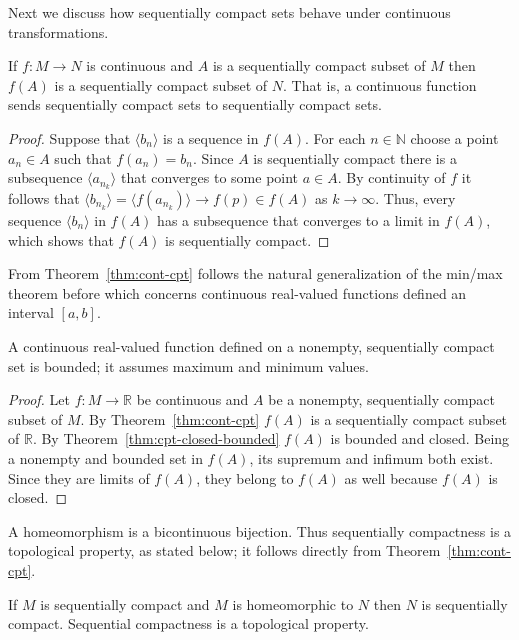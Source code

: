 Next we discuss how sequentially compact sets behave under continuous transformations.

\begin{thm}
  \label{thm:cont-cpt}
  If $f : M \to N$ is continuous and $A$ is a sequentially compact subset of $M$ then $f(A)$ is a sequentially compact subset of $N$.
  That is, a continuous function sends sequentially compact sets to sequentially compact sets.
\end{thm}

\begin{proof}
  Suppose that $\langle b_n \rangle$ is a sequence in $f(A)$.
  For each $n \in \mathbb{N}$ choose a point $a_n \in A$ such that $f(a_n) = b_n$.
  Since $A$ is sequentially compact there is a subsequence $\langle a_{n_k} \rangle$ that converges to some point $a \in A$.
  By continuity of $f$ it follows that $\langle b_{n_k} \rangle = \langle f(a_{n_k}) \rangle \to f(p) \in f(A)$ as $k \to \infty$.
  Thus, every sequence $\langle b_n \rangle$ in $f(A)$ has a subsequence that converges to a limit in $f(A)$, which shows that $f(A)$ is sequentially compact.
\end{proof}

From Theorem~\ref{thm:cont-cpt} follows the natural generalization of the min/max theorem before which concerns continuous real-valued functions defined an interval $[a,b]$.

\begin{cor}
  A continuous real-valued function defined on a nonempty, sequentially compact set is bounded; it assumes maximum and minimum values.
\end{cor}

\begin{proof}
  Let $f: M \to \mathbb{R}$ be continuous and $A$ be a nonempty, sequentially compact subset of $M$.
  By Theorem~\ref{thm:cont-cpt} $f(A)$ is a sequentially compact subset of $\mathbb{R}$.
  By Theorem~\ref{thm:cpt-closed-bounded} $f(A)$ is bounded and closed.
  Being a nonempty and bounded set in $f(A)$, its supremum and infimum both exist.
  Since they are limits of $f(A)$, they belong to $f(A)$ as well because $f(A)$ is closed. 
\end{proof}

A homeomorphism is a bicontinuous bijection.
Thus sequentially compactness is a topological property, as stated below; it follows directly from Theorem~\ref{thm:cont-cpt}.

\begin{thm}
  If $M$ is sequentially compact and $M$ is homeomorphic to $N$ then $N$ is sequentially compact.
  Sequential compactness is a topological property.
\end{thm}

